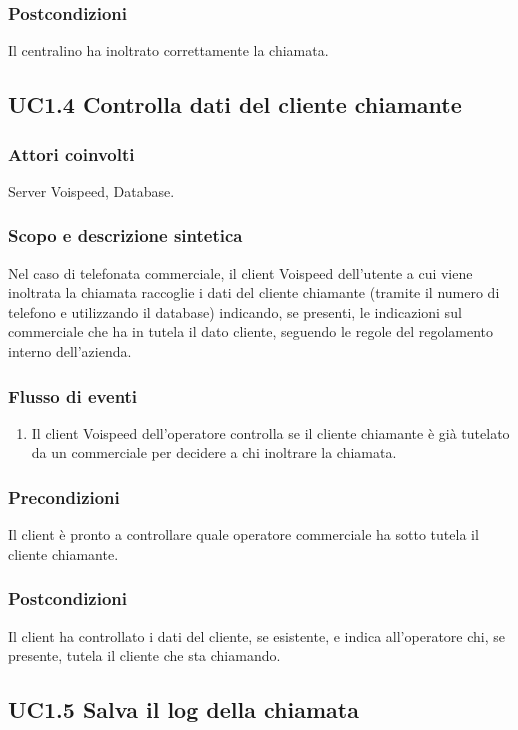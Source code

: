 \subsubsection*{Postcondizioni} Il centralino ha inoltrato correttamente la chiamata.

\subsection*{UC1.4 Controlla dati del cliente chiamante}
\subsubsection*{Attori coinvolti} Server Voispeed, Database.
\subsubsection*{Scopo e descrizione sintetica}
Nel caso di telefonata commerciale, il client Voispeed dell'utente a cui viene inoltrata la chiamata raccoglie i dati del cliente chiamante (tramite il numero di telefono e utilizzando il database) indicando, se presenti, le indicazioni sul commerciale che ha in tutela il dato cliente, seguendo le regole del regolamento interno dell'azienda.
\subsubsection*{Flusso di eventi}
\begin{enumerate}
\item Il client Voispeed dell'operatore controlla se il cliente chiamante \` e gi\` a tutelato da un commerciale per decidere a chi inoltrare la chiamata.
\end{enumerate}
\subsubsection*{Precondizioni} Il client \`e pronto a controllare quale operatore commerciale ha sotto tutela il cliente chiamante.
\subsubsection*{Postcondizioni} Il client ha controllato i dati del cliente, se esistente, e indica all'operatore chi, se presente, tutela il cliente che sta chiamando.

\subsection*{UC1.5 Salva il log della chiamata}
